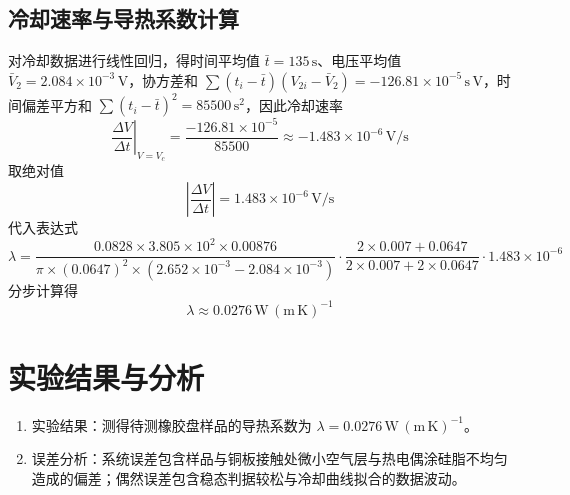 \documentclass[12pt]{ctexart}
\begin{document}
\subsection{冷却速率与导热系数计算}
对冷却数据进行线性回归，得时间平均值 $\bar{t}=135\,\mathrm{s}$、电压平均值 $\bar{V}_2=2.084\times 10^{-3}\,\mathrm{V}$，协方差和 $\sum (t_i - \bar{t})(V_{2i} - \bar{V}_2) = -126.81\times 10^{-5}\,\mathrm{s\,V}$，时间偏差平方和 $\sum (t_i - \bar{t})^2 = 85500\,\mathrm{s^2}$，因此冷却速率
\[
\left. \frac{\Delta V}{\Delta t} \right|_{V=V_c} = \frac{-126.81\times 10^{-5}}{85500} \approx -1.483\times 10^{-6}\,\mathrm{V/s}
\]
取绝对值
\[
\left| \frac{\Delta V}{\Delta t} \right| = 1.483\times 10^{-6}\,\mathrm{V/s}
\]
代入表达式
\[
\lambda = \frac{0.0828\times 3.805\times 10^{2}\times 0.00876}{\pi\times (0.0647)^2\times (2.652\times 10^{-3} - 2.084\times 10^{-3})} \cdot \frac{2\times 0.007 + 0.0647}{2\times 0.007 + 2\times 0.0647} \cdot 1.483\times 10^{-6}
\]
分步计算得
\[
\lambda \approx 0.0276\,\mathrm{W\,(m\,K)^{-1}}
\]

\section{实验结果与分析}
\begin{enumerate}
\item 实验结果：测得待测橡胶盘样品的导热系数为 $\lambda = 0.0276\,\mathrm{W\,(m\,K)^{-1}}$。
\item 误差分析：系统误差包含样品与铜板接触处微小空气层与热电偶涂硅脂不均匀造成的偏差；偶然误差包含稳态判据较松与冷却曲线拟合的数据波动。
\end{enumerate}
\end{document}
